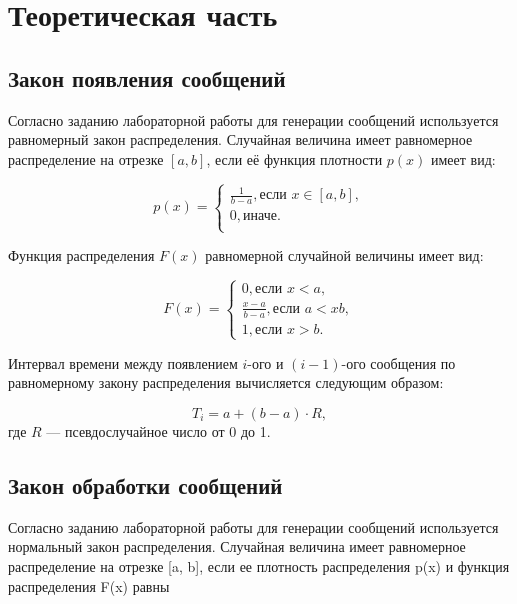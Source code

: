 \documentclass[a4paper, 14pt, unknownkeysallowed]{extreport}
\begin{document}

\setcounter{page}{2}

\chapter{Теоретическая часть}

\section{Закон появления сообщений}

Согласно заданию лабораторной работы для генерации сообщений используется равномерный закон распределения.
Случайная величина имеет равномерное распределение на отрезке $[a, b]$, если её функция плотности $p(x)$ имеет вид:

\begin{equation}
	\label{for:equal-1}
	p(x) = 
	\begin{cases}
		\frac{1}{b - a}, \text{если } x \in [a, b],\\
		0, \text{иначе.} \\
	\end{cases}
\end{equation}

Функция распределения $F(x)$ равномерной случайной величины имеет вид:

\begin{equation}
	\label{for:equal-2}
	F(x) = 
	\begin{cases}
		0, \text{если } x  < a, \\
		\frac{x - a}{b - a}, \text{если } a < x  b,\\
		1, \text{если } x > b. 
	\end{cases}
\end{equation}

Интервал времени между появлением $i$-ого и $(i - 1)$-ого сообщения по равномерному закону распределения вычисляется следующим образом:

\begin{equation}
	T_{i} = a + (b - a) \cdot R,
\end{equation}
где $R$ --- псевдослучайное число от 0 до 1.

\section{Закон обработки сообщений}

Согласно заданию лабораторной работы для генерации сообщений используется нормальный закон распределения.
Случайная величина имеет равномерное распределение на отрезке [a, b], если ее плотность распределения p(x) и функция распределения F(x) равны
\end{document}
